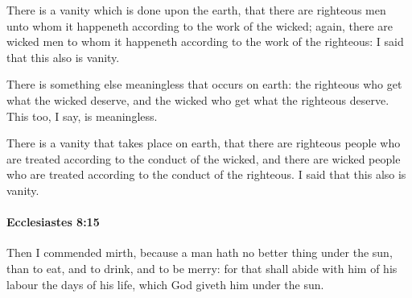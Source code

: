 			\begin{versebox}
					\item[BHS] 
					\item[LXX] 
					\item[ASV] There is a vanity which is done upon the earth, that there are righteous men unto whom it happeneth according to the work of the wicked; again, there are wicked men to whom it happeneth according to the work of the righteous: I said that this also is vanity.
					\item[NIV] There is something else meaningless that occurs on earth: the righteous who get what the wicked deserve, and the wicked who get what the righteous deserve. This too, I say, is meaningless.
					\item[NRSV] There is a vanity that takes place on earth, that there are righteous people who are treated according to the conduct of the wicked, and there are wicked people who are treated according to the conduct of the righteous. I said that this also is vanity.
			\end{versebox}

		\paragraph{Ecclesiastes 8:15} %
			\label{ECCLESIASTES-8-15}

			Then I commended mirth, because a man hath no better thing under the sun, than to eat, and to drink, and to be merry: for that shall abide with him of his labour the days of his life, which God giveth him under the sun.

